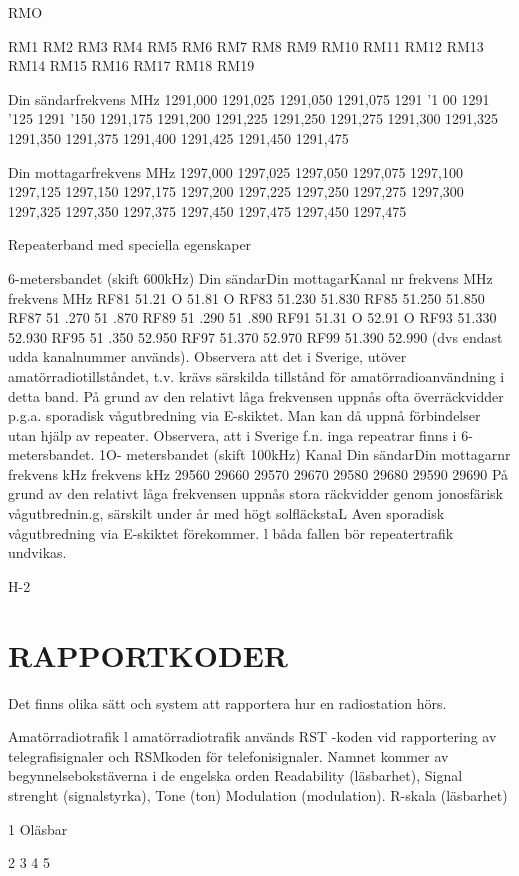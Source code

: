 \documentclass[a4paper,twoside,twocolumn,openright]{book}
\begin{document}
{{{{{{{{{{{RMO

RM1
RM2
RM3
RM4
RM5
RM6
RM7
RM8
RM9
RM10
RM11
RM12
RM13
RM14
RM15
RM16
RM17
RM18
RM19

Din sändarfrekvens MHz
1291,000
1291,025
1291,050
1291,075
1291 '1 00
1291 '125
1291 '150
1291,175
1291,200
1291,225
1291,250
1291,275
1291,300
1291,325
1291,350
1291,375
1291,400
1291,425
1291,450
1291,475

Din mottagarfrekvens MHz
1297,000
1297,025
1297,050
1297,075
1297,100
1297,125
1297,150
1297,175
1297,200
1297,225
1297,250
1297,275
1297,300
1297,325
1297,350
1297,375
1297,450
1297,475
1297,450
1297,475

Repeaterband med speciella egenskaper

6-metersbandet (skift 600kHz)
Din sändarDin mottagarKanal
nr
frekvens MHz frekvens MHz
RF81
51.21 O
51.81 O
RF83
51.230
51.830
RF85
51.250
51.850
RF87
51 .270
51 .870
RF89
51 .290
51 .890
RF91
51.31 O
52.91 O
RF93
51.330
52.930
RF95
51 .350
52.950
RF97
51.370
52.970
RF99
51.390
52.990
(dvs endast udda kanalnummer används).
Observera att det i Sverige, utöver amatörradiotillståndet, t.v. krävs särskilda tillstånd
för amatörradioanvändning i detta band.
På grund av den relativt låga frekvensen
uppnås ofta överräckvidder p.g.a. sporadisk
vågutbredning via E-skiktet. Man kan då
uppnå förbindelser utan hjälp av repeater.
Observera, att i Sverige f.n. inga repeatrar
finns i 6-metersbandet.
1O- metersbandet (skift 100kHz)
Kanal
Din sändarDin mottagarnr
frekvens kHz
frekvens kHz
29560
29660
29570
29670
29580
29680
29590
29690
På grund av den relativt låga frekvensen
uppnås stora räckvidder genom jonosfärisk
vågutbrednin.g, särskilt under år med högt
solfläckstaL Aven sporadisk vågutbredning
via E-skiktet förekommer. l båda fallen bör
repeatertrafik undvikas.

H-2

\chapter{RAPPORTKODER}
Det finns olika sätt och system att rapportera hur en radiostation hörs.

Amatörradiotrafik
l amatörradiotrafik används RST -koden vid
rapportering av telegrafisignaler och RSMkoden för telefonisignaler. Namnet kommer
av begynnelsebokstäverna i de engelska
orden
Readability
(läsbarhet),
Signal strenght
(signalstyrka),
Tone
(ton)
Modulation
(modulation).
R-skala (läsbarhet)

1 Oläsbar

2
3
4
5

}}}}}}}}}}}
\end{document}
